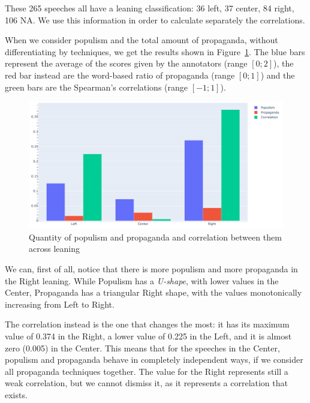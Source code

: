 These 265 speeches all have a leaning classification: 36 left, 37 center, 84 right, 106 NA. We use this information in order to calculate separately the correlations.


When we consider populism and the total amount of propaganda, without differentiating by techniques, we get the results shown in Figure~\ref{fig:populism_propaganda_quantities_by_leaning}. The blue bars represent the average of the scores given by the annotators (range $[0;2]$), the red bar instead are the word-based ratio of propaganda (range $[0;1]$) and the green bars are the Spearman's correlations (range $[-1;1]$).

\begin{figure}[!htbp]
    \centering
    \includegraphics[width=\linewidth]{figures/populism_propaganda_quantities_by_leaning.pdf}
    \caption{Quantity of populism and propaganda and correlation between them across leaning}
    \label{fig:populism_propaganda_quantities_by_leaning}
\end{figure}

We can, first of all, notice that there is more populism and more propaganda in the Right leaning.
While Populism has a \emph{U-shape}, with lower values in the Center, Propaganda has a triangular Right shape, with the values monotonically increasing from Left to Right.

The correlation instead is the one that changes the most: it has its maximum value of 0.374 in the Right, a lower value of 0.225 in the Left, and it is almost zero (0.005) in the Center.
This means that for the speeches in the Center, populism and propaganda behave in completely independent ways, if we consider all propaganda techniques together.
The value for the Right represents still a weak correlation, but we cannot dismiss it, as it represents a correlation that exists.


